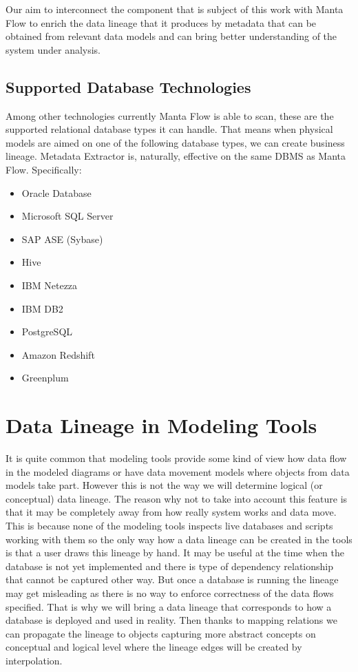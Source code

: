 Our aim to interconnect the component that is subject of this work with Manta Flow to enrich the data lineage that it produces by metadata that can be obtained from relevant data models and can bring better understanding of the system under analysis.

\subsection{Supported Database Technologies}
Among other technologies currently Manta Flow is able to scan, these are the supported relational database types it can handle. 
That means when physical models are aimed on one of the following database types, we can create business lineage. Metadata Extractor is, naturally, effective on the same DBMS as Manta Flow. Specifically:
\begin{itemize}
	\item Oracle Database
	\item Microsoft SQL Server
	\item SAP ASE (Sybase)
	\item Hive
	\item IBM Netezza
	\item IBM DB2
	\item PostgreSQL
	\item Amazon Redshift
	\item Greenplum
\end{itemize}

\section{Data Lineage in Modeling Tools}

It is quite common that modeling tools provide some kind of view how data flow in the modeled diagrams or have data movement models where objects from data models take part. 
However this is not the way we will determine logical (or conceptual) data lineage.
The reason why not to take into account this feature is that it may be completely away from how really system works and data move. This is because none of the modeling tools inspects live databases and scripts working with them so the only way how a data lineage can be created in the tools is that a user draws this lineage by hand. 
It may be useful at the time when the database is not yet implemented and there is type of dependency relationship that cannot be captured other way. But once a database is running the lineage may get misleading as there is no way to enforce correctness of the data flows specified.
That is why we will bring a data lineage that corresponds to how a database is deployed and used in reality. Then thanks to mapping relations we can propagate the lineage to objects capturing more abstract concepts on conceptual and logical level where the lineage edges will be created by interpolation.